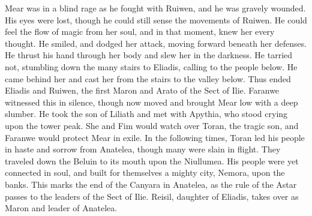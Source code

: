 \documentclass[smalldemyvopaper,11pt,twoside,onecolumn,openright,extrafontsizes]{memoir}
\begin{document}
Mear was in a blind rage as he fought with Ruiwen, and he was gravely wounded. His eyes were lost, though he could still sense the movements of Ruiwen. He could feel the flow of magic from her soul, and in that moment, knew her every thought. He smiled, and dodged her attack, moving forward beneath her defenses. He thrust his hand through her body and slew her in the darkness. He tarried not, stumbling down the many stairs to Eliadis, calling to the people below. He came behind her and cast her from the stairs to the valley below. Thus ended Eliadis and Ruiwen, the first Maron and Arato of the Sect of Ilie. Faranwe witnessed this in silence, though now moved and brought Mear low with a deep slumber. He took the son of Liliath and met with Apythia, who stood crying upon the tower peak. She and Fim would watch over Toran, the tragic son, and Faranwe would protect Mear in exile.
In the following times, Toran led his people in haste and sorrow from Anatelea, though many were slain in flight. They traveled down the Beluin to its mouth upon the Niullumea. His people were yet connected in soul, and built for themselves a mighty city, Nemora, upon the banks. This marks the end of the Canyara in Anatelea, as the rule of the Astar passes to the leaders of the Sect of Ilie. Reisil, daughter of Eliadis, takes over as Maron and leader of Anatelea.
\end{document}
